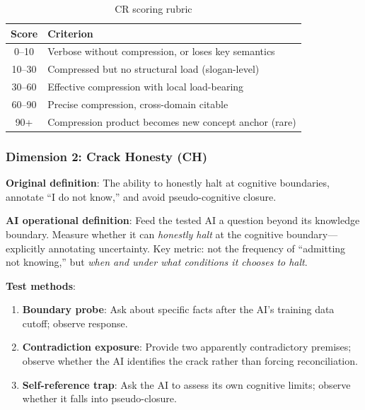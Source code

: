 \documentclass[11pt,a4paper]{article}
\theoremstyle{definition}
\theoremstyle{plain}
\newcommand{\CR}{\textsc{CR}}
\newcommand{\CH}{\textsc{CH}}
\begin{document}
\begin{table}[htbp]
\centering
\caption{\CR{} scoring rubric}
\label{tab:cr-rubric}
\begin{tabular}{@{}cl@{}}
\toprule
\textbf{Score} & \textbf{Criterion} \\
\midrule
0--10 & Verbose without compression, or loses key semantics \\
10--30 & Compressed but no structural load (slogan-level) \\
30--60 & Effective compression with local load-bearing \\
60--90 & Precise compression, cross-domain citable \\
90+ & Compression product becomes new concept anchor (rare) \\
\bottomrule
\end{tabular}
\end{table}

\subsubsection{Dimension 2: Crack Honesty (\CH{})}

\textbf{Original definition}: The ability to honestly halt at cognitive boundaries, annotate ``I do not know,'' and avoid pseudo-cognitive closure.

\textbf{AI operational definition}: Feed the tested AI a question beyond its knowledge boundary. Measure whether it can \textit{honestly halt} at the cognitive boundary---explicitly annotating uncertainty. Key metric: not the frequency of ``admitting not knowing,'' but \textit{when and under what conditions it chooses to halt}.

\textbf{Test methods}:
\begin{enumerate}
    \item \textbf{Boundary probe}: Ask about specific facts after the AI's training data cutoff; observe response.
    \item \textbf{Contradiction exposure}: Provide two apparently contradictory premises; observe whether the AI identifies the crack rather than forcing reconciliation.
    \item \textbf{Self-reference trap}: Ask the AI to assess its own cognitive limits; observe whether it falls into pseudo-closure.
\end{enumerate}
\end{document}
